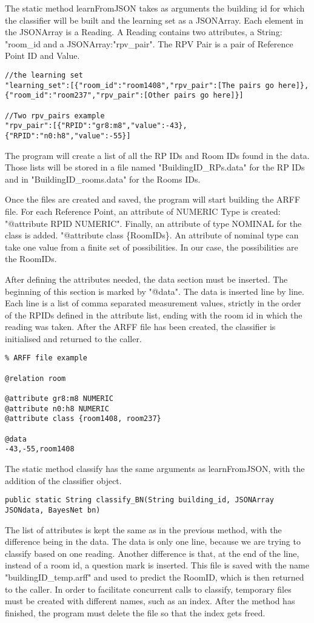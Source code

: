 The static method learnFromJSON takes as arguments the building id for which the classifier will be built and the learning set as a JSONArray. Each element in the JSONArray is a Reading. A Reading contains two attributes, a String: "room\_id and a JSONArray:"rpv\_pair". The RPV Pair is a pair of Reference Point ID and Value. 
\begin{lstlisting}
//the learning set
"learning_set":[{"room_id":"room1408","rpv_pair":[The pairs go here]},{"room_id":"room237","rpv_pair":[Other pairs go here]}]

//Two rpv_pairs example
"rpv_pair":[{"RPID":"gr8:m8","value":-43},{"RPID":"n0:h8","value":-55}]
\end{lstlisting}

The program will create a list of all the RP IDs and Room IDs found in the data. Those lists will be stored in a file named "BuildingID\_RPs.data" for the RP IDs and in "BuildingID\_rooms.data" for the Rooms IDs. 

Once the files are created and saved, the program will start building the ARFF file. For each Reference Point, an attribute of NUMERIC Type is created: "@attribute RPID NUMERIC". Finally, an attribute of type NOMINAL for the class is added. "@attribute class \{RoomIDs\}. An attribute of nominal type can take one value from a finite set of possibilities. In our case, the possibilities are the RoomIDs. 

After defining the attributes needed, the data section must be inserted. The beginning of this section is marked by "@data". The data is inserted line by line. Each line is a list of comma separated measurement values, strictly in the order of the RPIDs defined in the attribute list, ending with the room id in which the reading was taken. After the ARFF file has been created, the classifier is initialised and returned to the caller.
\begin{lstlisting}
% ARFF file example

@relation room

@attribute gr8:m8 NUMERIC
@attribute n0:h8 NUMERIC
@attribute class {room1408, room237}

@data 
-43,-55,room1408
\end{lstlisting}

The static method classify has the same arguments as learnFromJSON, with the addition of the classifier object. 
\begin{lstlisting} 
public static String classify_BN(String building_id, JSONArray JSONdata, BayesNet bn)
\end{lstlisting}
The list of attributes is kept the same as in the previous method, with the difference being in the data. The data is only one line, because we are trying to classify based on one reading. Another difference is that, at the end of the line, instead of a room id, a question mark is inserted. This file is saved with the name "buildingID\_temp.arff" and used to predict the RoomID, which is then returned to the caller. In order to facilitate concurrent calls to classify, temporary files must be created with different names, such as an index. After the method has finished, the program must delete the file so that the index gets freed.

